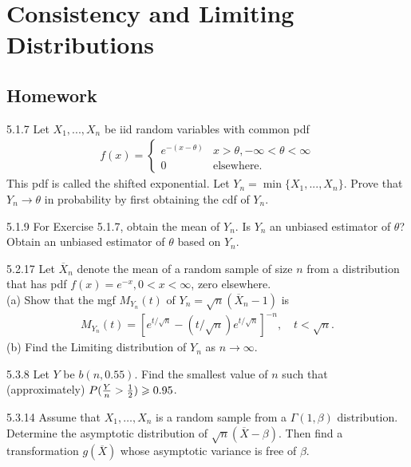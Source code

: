\chapter{Consistency and
Limiting Distributions}


\section{Homework}

\begin{exercise}{5.1.7}{}
    Let $X_1,...,X_n$ be iid random variables with common pdf
    \begin{align*}
        f(x)=\left\{\begin{matrix}
            e^{-(x-\theta)} & x>\theta,-\infty<\theta<\infty\\
           0 & \text{elsewhere}.
           \end{matrix}\right.
    \end{align*}
    This pdf is called the shifted exponential. Let $Y_n=\min\{X_1,...,X_n\}$.
    Prove that $Y_n\rightarrow \theta$ in probability by first obtaining the cdf of $Y_n$.
\end{exercise}

\begin{exercise}{5.1.9}{}
    For Exercise 5.1.7, obtain the mean of $Y_n$. Is $Y_n$ an unbiased estimator of $\theta$? Obtain an unbiased estimator of $\theta$ based on $Y_n$.
\end{exercise}

\begin{exercise}{5.2.17}{}
    Let $\overline{X}_n$ denote the mean of a random sample of size $n$ from a distribution that has pdf 
    $f(x)=e^{-x},0<x<\infty$, zero elsewhere.\\
    (a) Show that the mgf $M_{Y_n}(t)$ of $Y_n=\sqrt{n}(\overline{X}_n-1)$ is 
    \begin{align*}
        M_{Y_n}(t) = [e^{t/\sqrt{n}}-(t/\sqrt{n})e^{t/\sqrt{n}}]^{-n}, \quad t<\sqrt{n}.
    \end{align*} 
    (b) Find the Limiting distribution of $Y_n$ as $n\rightarrow \infty$.
\end{exercise}

\begin{exercise}{5.3.8}{}
    Let $Y$ be $b(n,0.55)$. Find the smallest value of $n$ such that (approximately) $P(\frac{Y}{n}>\frac{1}{2})\geqslant 0.95$.
\end{exercise}

\begin{exercise}{5.3.14}{}
    Assume that $X_1,\dots,X_n$ is a random sample from a $\Gamma(1,\beta)$ distribution. 
    Determine the asymptotic distribution of $\sqrt{n}(\overline{X}-\beta)$. Then find a transformation $g(\overline{X})$
    whose asymptotic variance is free of $\beta$.
\end{exercise}

